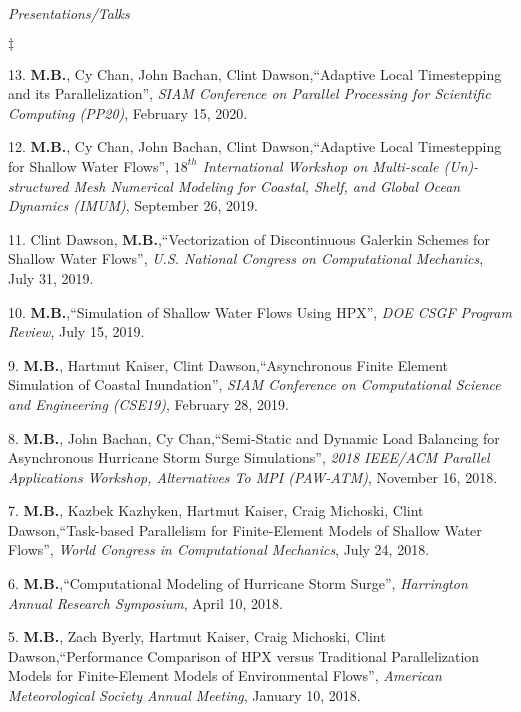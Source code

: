 \documentclass[margin,line]{res}
\newenvironment{list2}{
  \begin{list}{$\ddagger$}{%
      \setlength{\itemsep}{0in}
      \setlength{\parsep}{0in} \setlength{\parskip}{0in}
      \setlength{\topsep}{0in} \setlength{\partopsep}{0in}
      \setlength{\leftmargin}{0.2in}}}{\end{list}}
\newcommand{\talk}[4]{%
#1,``#2'', {\it #3}, #4.%
}
\begin{document}
\begin{resume}

\textit{Presentations/Talks}
\vspace{0.05in}
\begin{list2}

\item[13.] \talk{{\bf M.B.}, Cy Chan, John Bachan, Clint Dawson}{Adaptive Local Timestepping and its Parallelization}{SIAM Conference on Parallel Processing for Scientific Computing (PP20)}{February 15, 2020}

\item[12.] \talk{{\bf M.B.}, Cy Chan, John Bachan, Clint Dawson}{Adaptive Local Timestepping for Shallow Water Flows}{$18^{th}$ International Workshop on Multi-scale (Un)-structured Mesh Numerical Modeling for Coastal, Shelf, and Global Ocean Dynamics (IMUM)}{September 26, 2019}

\item[11.] \talk{Clint Dawson, {\bf M.B.}}{Vectorization of Discontinuous Galerkin Schemes for Shallow Water Flows}{U.S. National Congress on Computational Mechanics}{July 31, 2019}

\item[10.] \talk{{\bf M.B.}}{Simulation of Shallow Water Flows Using HPX}{DOE CSGF Program Review}{July 15, 2019}

\item[9.] \talk{{\bf M.B.}, Hartmut Kaiser, Clint Dawson}{Asynchronous Finite Element Simulation of Coastal Inundation}{SIAM Conference on Computational Science and Engineering (CSE19)}{February 28, 2019}

\item[8.] \talk{{\bf M.B.}, John Bachan, Cy Chan}{Semi-Static and Dynamic Load Balancing for Asynchronous Hurricane Storm Surge Simulations}{2018 IEEE/ACM Parallel Applications Workshop, Alternatives To MPI (PAW-ATM)}{November 16, 2018}

\item[7.] \talk{{\bf M.B.}, Kazbek Kazhyken, Hartmut Kaiser, Craig Michoski, Clint Dawson}{Task-based Parallelism for Finite-Element Models of Shallow Water Flows}{World Congress in Computational Mechanics}{July 24, 2018}

\item[6.] \talk{{\bf M.B.}}{Computational Modeling of Hurricane Storm Surge}{Harrington Annual Research Symposium}{April 10, 2018}

\item[5.] \talk{{\bf M.B.}, Zach Byerly, Hartmut Kaiser, Craig Michoski, Clint Dawson}{Performance Comparison of HPX versus Traditional Parallelization Models for Finite-Element Models of Environmental Flows}{American Meteorological Society Annual Meeting}{January 10, 2018}


\end{list2}
\end{resume}
\end{document}
